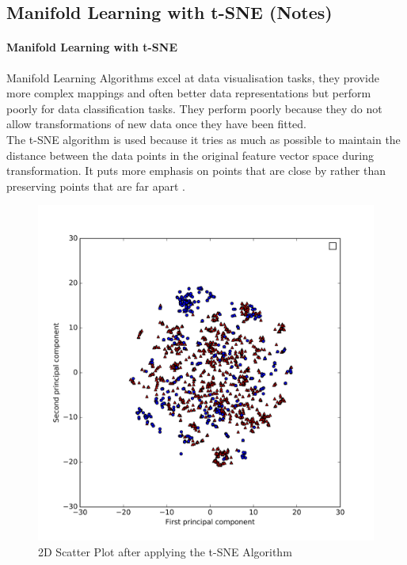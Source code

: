 \documentclass[a4paper,12pt]{report}
\begin{document}
	
	
		\subsection{Manifold Learning with t-SNE (Notes)}
		\paragraph{Manifold Learning with t-SNE}
		Manifold Learning Algorithms excel at data visualisation tasks, they provide more complex mappings and often better data representations but perform poorly for data classification tasks. They perform poorly because they do not allow transformations of new data once they have been fitted.\\
		The t-SNE algorithm is used because it tries as much as possible to maintain the distance between the data points in the original feature vector space during transformation. It puts more emphasis on points that are close by rather than preserving points that are far apart \cite{Mueller2016}.
		\begin{figure}[H]
			\centering
			\includegraphics[width=\textwidth,scale=1,totalheight=0.4\textheight]{images/scatter_tsne}
			\caption{2D Scatter Plot after applying the t-SNE Algorithm}
			\label{fig:scatter_tsne_2D}
		\end{figure}
\end{document}
